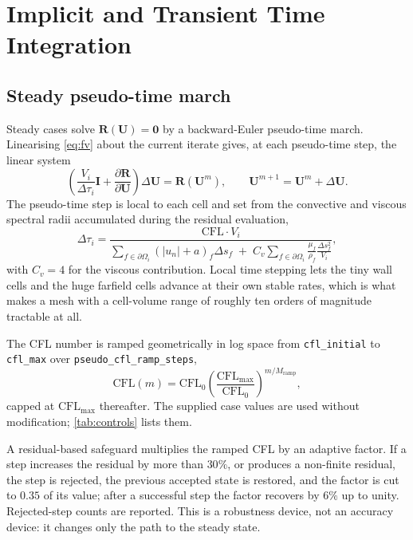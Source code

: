 \section{Implicit and Transient Time Integration}
\label{sec:implicit}

\subsection{Steady pseudo-time march}

Steady cases solve $\mathbf{R}(\mathbf{U})=\mathbf{0}$ by a backward-Euler
pseudo-time march. Linearising \cref{eq:fv} about the current iterate gives, at
each pseudo-time step, the linear system
\begin{equation}
  \left(\frac{V_i}{\Delta\tau_i}\mathbf{I}
  +\frac{\partial\mathbf{R}}{\partial\mathbf{U}}\right)\Delta\mathbf{U}
  =\mathbf{R}(\mathbf{U}^m),
  \qquad
  \mathbf{U}^{m+1}=\mathbf{U}^m+\Delta\mathbf{U}.
  \label{eq:steadysystem}
\end{equation}
The pseudo-time step is local to each cell and set from the convective and
viscous spectral radii accumulated during the residual evaluation,
\begin{equation}
  \Delta\tau_i=\frac{\mathrm{CFL}\cdot V_i}
  {\displaystyle\sum_{f\in\partial\Omega_i}\left(|u_n|+a\right)_f\Delta s_f
  \;+\;C_v\sum_{f\in\partial\Omega_i}\frac{\mu_f}{\rho_f}
  \frac{\Delta s_f^2}{V_i}},
  \label{eq:dtau}
\end{equation}
with $C_v=4$ for the viscous contribution. Local time stepping lets the tiny
wall cells and the huge farfield cells advance at their own stable rates, which
is what makes a mesh with a cell-volume range of roughly ten orders of magnitude
tractable at all.

The CFL number is ramped geometrically in log space from
\texttt{cfl\_initial} to \texttt{cfl\_max} over
\texttt{pseudo\_cfl\_ramp\_steps},
\begin{equation}
  \mathrm{CFL}(m)=\mathrm{CFL}_0
  \left(\frac{\mathrm{CFL}_{\max}}{\mathrm{CFL}_0}\right)^{m/M_{\mathrm{ramp}}},
  \label{eq:ramp}
\end{equation}
capped at $\mathrm{CFL}_{\max}$ thereafter. The supplied case values are used
without modification; \cref{tab:controls} lists them.

A residual-based safeguard multiplies the ramped CFL by an adaptive factor. If a
step increases the residual by more than $30\%$, or produces a non-finite
residual, the step is rejected, the previous accepted state is restored, and the
factor is cut to $0.35$ of its value; after a successful step the factor recovers
by $6\%$ up to unity. Rejected-step counts are reported. This is a robustness
device, not an accuracy device: it changes only the path to the steady state.


